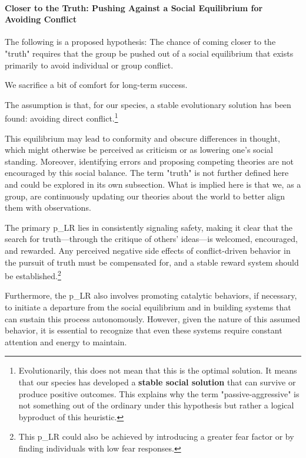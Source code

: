 \paragraph{Closer to the Truth: Pushing Against a Social Equilibrium for Avoiding Conflict}

The following is a proposed hypothesis: The chance of coming closer to the "truth" requires that the group be pushed out of a social equilibrium that exists primarily to avoid individual or group conflict.

\begin{center} We sacrifice a bit of comfort for long-term success. \end{center}

The assumption is that, for our species, a stable evolutionary solution has been found: avoiding direct conflict.\footnote{
	Evolutionarily, this does not mean that this is the optimal solution. It means that our species has developed a \textbf{stable social solution} that can survive or produce positive outcomes. This explains why the term "passive-aggressive" is not something out of the ordinary under this hypothesis but rather a logical byproduct of this heuristic.
}

This equilibrium may lead to conformity and obscure differences in thought, which might otherwise be perceived as criticism or as lowering one's social standing. Moreover, identifying errors and proposing competing theories are not encouraged by this social balance. The term "truth" is not further defined here and could be explored in its own subsection. What is implied here is that we, as a group, are continuously updating our theories about the world to better align them with observations.

The primary \gls{p_LR} lies in consistently signaling safety, making it clear that the search for truth—through the critique of others' ideas—is welcomed, encouraged, and rewarded. Any perceived negative side effects of conflict-driven behavior in the pursuit of truth must be compensated for, and a stable reward system should be established.\footnote{
	This \gls{p_LR} could also be achieved by introducing a greater fear factor or by finding individuals with low fear responses.
}

Furthermore, the \gls{p_LR} also involves promoting catalytic behaviors, if necessary, to initiate a departure from the social equilibrium and in building systems that can sustain this process autonomously. However, given the nature of this assumed behavior, it is essential to recognize that even these systems require constant attention and energy to maintain.

